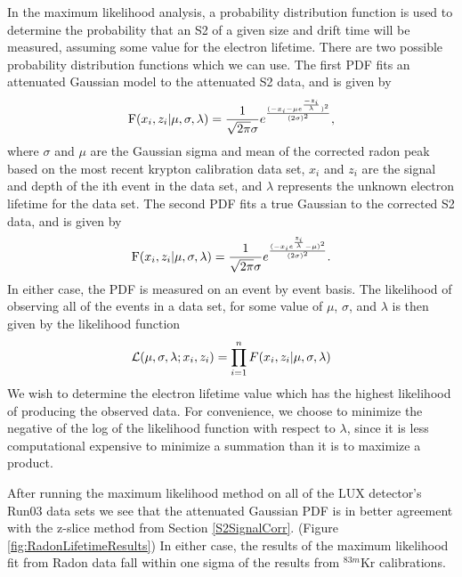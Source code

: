 \documentclass[a4paper,12pt]{article}
\begin{document}
{%
In the maximum likelihood analysis, a probability distribution function is used to determine the probability that an S2 of a given size and drift time will be measured, assuming some value for the electron lifetime.  There are two possible probability distribution functions which we can use.  The first PDF fits an attenuated Gaussian model to the attenuated S2 data, and is given by
\begin{equation}
\mbox{F}(x_i, z_i \text{\textbar} \mu, \sigma, \lambda) = \frac{1}{\sqrt{2\pi}\sigma} e^\frac{(-x_i - \mu e^\frac{-z_i}{\lambda})^2}{(2\sigma)^2}, 
\end{equation}
where $\sigma$ and $\mu$ are the Gaussian sigma and mean of the corrected radon peak based on the most recent krypton calibration data set, $x_i$ and $z_i$ are the signal and depth of the ith event in the data set, and $\lambda$ represents the unknown electron lifetime for the data set.  The second PDF fits a true Gaussian to the corrected S2 data, and is given by
\begin{equation}
\mbox{F}(x_i, z_i \text{\textbar} \mu, \sigma, \lambda) = \frac{1}{\sqrt{2 \pi} \sigma} e^\frac{(-x_i e^\frac{z_i}{\lambda} - \mu)^2}{(2 \sigma)^2}. 
\end{equation}
In either case, the PDF is measured on an event by event basis.  The likelihood of observing all of the events in a data set, for some value of $\mu$, $\sigma$, and $\lambda$ is then given by the likelihood function
\begin{equation}
\mathcal{L}(\mu, \sigma, \lambda ; x_i, z_i) = \prod_{i=1}^{n} F(x_i, z_i \text{\textbar} \mu, \sigma, \lambda)
\end{equation}
We wish to determine the electron lifetime value which has the highest likelihood of producing the observed data.  For convenience, we choose to minimize the negative of the log of the likelihood function with respect to $\lambda$, since it is less computational expensive to minimize a summation than it is to maximize a product.  

After running the maximum likelihood method on all of the LUX detector's Run03 data sets we see that the attenuated Gaussian PDF is in better agreement with the z-slice method from Section \ref{S2SignalCorr}. (Figure \ref{fig:RadonLifetimeResults}) In either case, the results of the maximum likelihood fit from Radon data fall within one sigma of the results from $^{83m}$Kr calibrations. 

}
\end{document}
